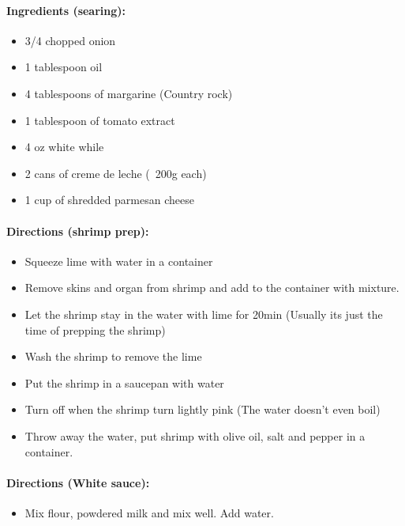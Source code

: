 \documentclass{article}
\begin{document}
\paragraph{Ingredients (searing):}
\begin{itemize}
	\item 3/4 chopped onion
	\item 1 tablespoon oil
	\item 4 tablespoons of margarine (Country rock)
	\item 1 tablespoon of tomato extract
	\item 4 oz white while
	\item 2 cans of creme de leche (~200g each)
	\item 1 cup of shredded parmesan cheese
\end{itemize}

\paragraph{Directions (shrimp prep):}
\begin{itemize}
	\item Squeeze lime with water in a container
	\item Remove skins and organ from shrimp and add to the container with mixture.
	\item Let the shrimp stay in the water with lime for 20min (Usually its just the time of prepping the shrimp)
	\item Wash the shrimp to remove the lime
	\item Put the shrimp in a saucepan with water
	\item Turn off when the shrimp turn lightly pink (The water doesn't even boil)
	\item Throw away the water, put shrimp with olive oil, salt and pepper in a container.
\end{itemize}

\paragraph{Directions (White sauce):}
\begin{itemize}
	\item Mix flour, powdered milk and mix well. Add water.
\end{itemize}
\end{document}
